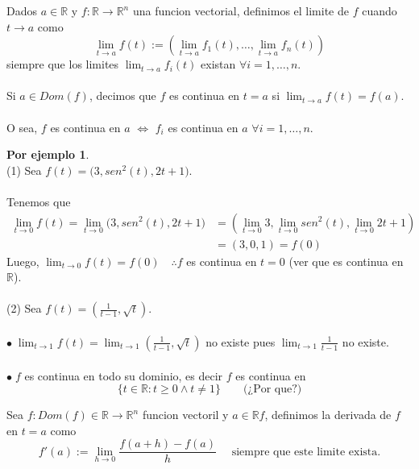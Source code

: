 \documentclass{article}
\theoremstyle{definition}
\newtheorem*{ej}{Por ejemplo}
\theoremstyle{remark}
\newcommand\bl{$\bullet\;$}
\begin{document}
  \; 
  \pagebreak \begin{defi}
  Dados $a \in \mathbb{R}$ y $f : \mathbb{R} \to \mathbb{R}^n$ una funcion vectorial, definimos el limite de $f$ cuando $t \to a $ como \[ 
  \lim_{t \to a}{f(t)} := \left( \lim_{t \to a}{f_1(t)}, \dots , \lim_{t \to a }{f_n(t)} \right) \]
  siempre que los limites $\lim_{t \to a}{f_i(t)}$ existan $\forall i = 1, \dots ,n$. 
  \\\\
Si $a \in Dom(f)$, decimos que $f$ es continua en $t=a$ si $\lim_{t \to a}{f(t) = f(a)}$.
\\ \\
O sea, $f$ es continua en $a$ $\Leftrightarrow$ $f_i$ es continua en $a$ $\forall i = 1, \dots , n$.
  \end{defi}
\begin{ej} \; \\
  \textcolor{verdep2}{(1)} Sea $f(t)=\big(3,sen^2(t),2t+1\big).$ \\ \\ Tenemos que \[ 
    \begin{aligned}
      \lim_{t\to 0}{f(t)}=\lim_{t \to 0}{\big(3,sen^2(t),2t+1\big)} &=\left(\lim_{t \to 0}{3},\lim_{t \to 0}{sen^2(t)},\lim_{t \to 0}{2t+1}\right) \\ 
                          &= (3,0,1)=f(0)
    \end{aligned}
  \]Luego, $\lim_{t \to 0}{f(t)=f(0)} \quad \therefore f$ es continua en $t=0$ (ver que es continua en $\mathbb{R}$).\\\\
  \textcolor{verdep2}{(2)} Sea $f(t)=\left(\frac{1}{t-1},\sqrt{t}\right)$. \\ \\ \bl $\lim_{t \to 1}{f(t)}=\lim_{t \to 1}{\left(\frac{1}{t-1},\sqrt{t}\right)}$ no existe pues $\lim_{t \to 1}{\frac{1}{t-1}}$ no existe. \\ \\ 
  \bl $f$ es continua en todo su dominio, es decir $f$ es continua en \[ 
    \{t \in \mathbb{R} : t \geq 0 \land t \neq 1 \} \quad \quad \big(\text{¿Por que?}\big)
  \]
\end{ej}
\begin{defi}
  Sea $f : Dom(f) \in \mathbb{R} \to \mathbb{R}^n$ funcion vectoril y $a \in \mathbb{R}f$, definimos la derivada de $f$ en $t=a$ como \[
    f'(a):= \lim_{h \to 0}{\frac{f(a+h)-f(a)}{h}} \quad \text{ siempre que este limite exista.}
  \]
\end{defi}
\end{document}
